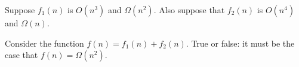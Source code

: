 \Needspace{1.25in}
\begin{prob}
    Suppose $f_1(n)$ is $O(n^3)$ and $\Omega(n^2)$. Also suppose that $f_2(n)$
    is $O(n^4)$ and $\Omega(n)$.

    Consider the function $f(n) = f_1(n) + f_2(n)$. True or false: it must be
    the case that $f(n) = \Omega(n^2)$.

    \Tf{}
\end{prob}
